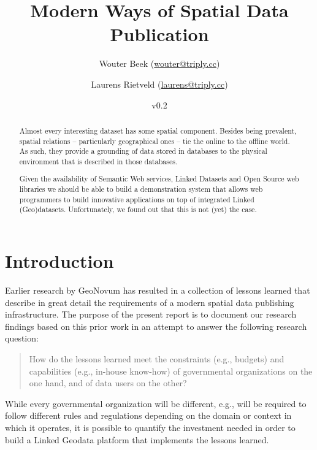 \documentclass[a4paper]{scrartcl}
\title{Modern Ways of Spatial Data Publication}
\author{Wouter Beek ({\small\url{wouter@triply.cc}})}
\author{Laurens Rietveld ({\small\url{laurens@triply.cc}})}
\affil{Triply ({\small\url{http://triply.cc}})}
\date{v0.2}
\begin{document}
\maketitle

\begin{abstract}
  \noindent Almost every interesting dataset has some spatial
  component.  Besides being prevalent, spatial relations --
  particularly geographical ones -- tie the online to the offline
  world.  As such, they provide a grounding of data stored in
  databases to the physical environment that is described in those
  databases.

  Given the availability of Semantic Web services, Linked Datasets and
  Open Source web libraries we should be able to build a demonstration
  system that allows web programmers to build innovative applications
  on top of integrated Linked (Geo)datasets.  Unfortunately, we found
  out that this is not (yet) the case.
\end{abstract}


\section{Introduction}

Earlier research by GeoNovum has resulted in a collection of lessons
learned that describe in great detail the requirements of a modern
spatial data publishing infrastructure.  The purpose of the present
report is to document our research findings based on this prior work
in an attempt to answer the following research question:

\begin{quote}
  How do the lessons learned meet the constraints (e.g., budgets) and
  capabilities (e.g., in-house know-how) of governmental organizations
  on the one hand, and of data users on the other?
\end{quote}

While every governmental organization will be different, e.g., will be
required to follow different rules and regulations depending on the
domain or context in which it operates, it is possible to quantify the
investment needed in order to build a Linked Geodata platform that
implements the lessons learned.
\end{document}
